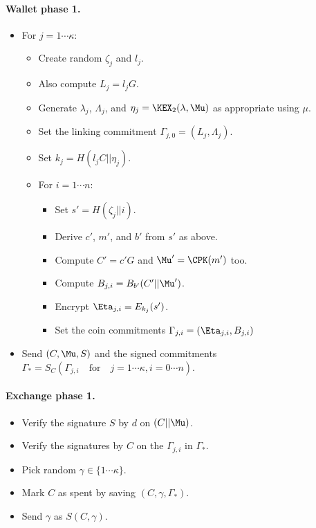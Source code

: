 \documentclass{llncs}
\begin{document}
\paragraph{Wallet phase 1.}
\begin{itemize}
\item  For $j=1 \cdots \kappa$:
   \begin{itemize}
   \item  Create random $\zeta_j$ and $l_j$.
   \item  Also compute $L_j = l_j G$.
   \item  Generate $\lambda_j$, $\Lambda_j$, and
            $\eta_j = \KEX_2(\lambda,\Mu)$ as appropriate
            using $\mu$. %
   \item  Set the linking commitment $\Gamma_{j,0} = (L_j,\Lambda_j)$. 
   \item  Set $k_j = H(l_j C || \eta_j)$.
\smallskip
   \item  For $i=1 \cdots n$:
      \begin{itemize}
      \item  Set $s' = H(\zeta_j || i)$.
      \item  Derive $c'$, $m'$, and $b'$ from $s'$ as above.
      \item  Compute $C' = c' G$ and $\Mu' = \CPK(m')$ too.
      \item  Compute $B_{j,i} = B_{b'}(C' || \Mu')$.
      \item  Encrypt $\Eta_{j,i} = E_{k_j}(s')$. 
      \item  Set the coin commitments $\Gamma_{j,i} = (\Eta_{j,i},B_{j,i})$
\end{itemize}
\smallskip
\end{itemize}
\item  Send $(C,\Mu,S)$ and the signed commitments
   $\Gamma_* = S_C( \Gamma_{j,i} \quad\textrm{for}\quad j=1\cdots\kappa, i=0 \cdots n )$.
\end{itemize}

\paragraph{Exchange phase 1.}
\begin{itemize}
\item  Verify the signature $S$ by $d$ on $(C || \Mu)$.
\item  Verify the signatures by $C$ on the $\Gamma_{j,i}$ in $\Gamma_*$.
\item  Pick random $\gamma \in \{1 \cdots \kappa\}$.
\item  Mark $C$ as spent by saving $(C,\gamma,\Gamma_*)$.
\item  Send $\gamma$ as $S(C,\gamma)$.
\end{itemize}
\end{document}
